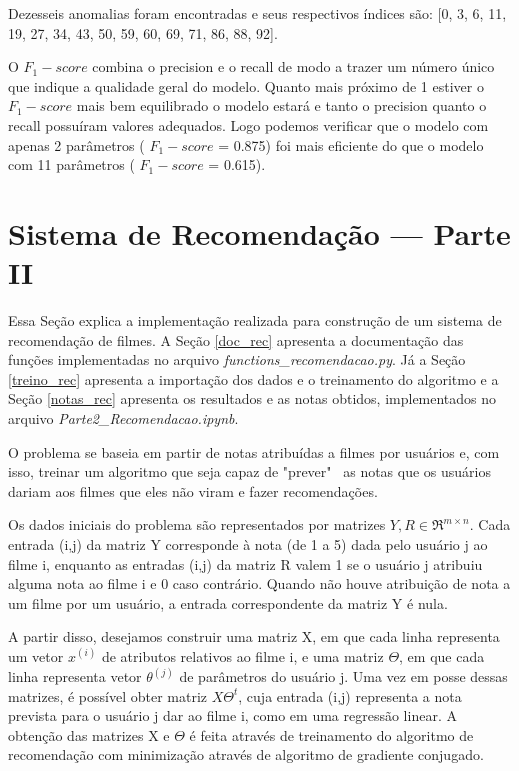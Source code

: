 \documentclass[12pt]{article}
\begin{document}
Dezesseis anomalias foram encontradas e seus respectivos índices são: [0, 3, 6, 11, 19, 27, 34, 43, 50, 59, 60, 69, 71, 86, 88, 92].

O $F_1-score$ combina o precision e o recall de modo a trazer um número único que indique a qualidade geral do modelo. Quanto mais próximo de 1 estiver o $F_1-score$ mais bem equilibrado o modelo estará e tanto o precision quanto o recall possuíram valores adequados.  Logo podemos verificar que o modelo com apenas 2 parâmetros ( $F_1-score$ = 0.875) foi mais eficiente do que o modelo com 11 parâmetros ( $F_1-score$ = 0.615).

\section{Sistema de Recomendação --- Parte II} \label{parte2}

Essa Seção explica a implementação realizada para construção de um sistema de recomendação de filmes. A Seção \ref{doc_rec} apresenta a documentação das funções implementadas no arquivo \textit{functions\_recomendacao.py}. Já a Seção \ref{treino_rec} apresenta a importação dos dados e o treinamento do algoritmo e a Seção \ref{notas_rec} apresenta os resultados e as notas obtidos, implementados no arquivo \textit{Parte2\_Recomendacao.ipynb}.

O problema se baseia em partir de notas atribuídas a filmes por usuários e, com isso, treinar um algoritmo que seja capaz de "prever" \ as notas que os usuários dariam aos filmes que eles não viram e fazer recomendações.

Os dados iniciais do problema são representados por matrizes $Y, R \in \Re^{m \times n}$. Cada entrada (i,j) da matriz Y corresponde à nota (de 1 a 5) dada pelo usuário j ao filme i, enquanto as entradas (i,j) da matriz R valem 1 se o usuário j atribuiu alguma nota ao filme i e 0 caso contrário. Quando não houve atribuição de nota a um filme por um usuário, a entrada correspondente da matriz Y é nula.

A partir disso, desejamos construir uma matriz X, em que cada linha representa um vetor $x^{(i)}$ de atributos relativos ao filme i, e uma matriz $\Theta$, em que cada linha representa vetor $\theta^{(j)}$ de parâmetros do usuário j. Uma vez em posse dessas matrizes, é possível obter matriz $X\Theta^t$, cuja entrada (i,j) representa a nota prevista para o usuário j dar ao filme i, como em uma regressão linear. A obtenção das matrizes X e $\Theta$ é feita através de treinamento do algoritmo de recomendação com minimização através de algoritmo de gradiente conjugado.
\end{document}
